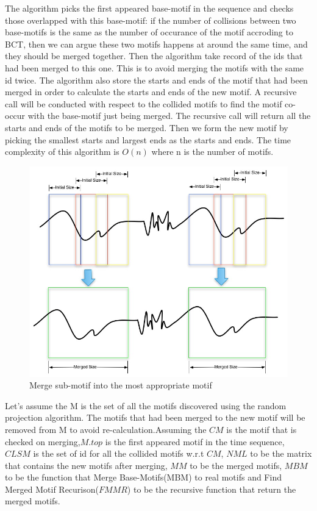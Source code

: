 \documentclass{article}
\begin{document}
 The algorithm picks the first appeared base-motif in the sequence and checks those 
overlapped with this base-motif: if the number of collisions between two base-motifs is the same as the number of occurance of the motif accroding 
to BCT, then we can argue these two motifs happens at around the same time, and they should be merged together. 
Then the algorithm take record of the ids that had been merged to this one. This is to avoid merging the motifs with the same id twice. 
The algorithm also store the starts and ends of the motif that had been merged in order to calculate the starts and ends of the new motif.
 A recursive call will be conducted with respect to the collided motifs to find the motif co-occur with the base-motif just being merged. 
The recursive call will return all the starts and ends of the motifs to be merged. Then we form the new motif by picking the smallest starts and largest ends as the starts and ends.  The time complexity of this algorithm is $O(n)$ where n is the number of motifs. 

\begin{figure}
  \centering
  \includegraphics[scale=0.3]{MotifMerge}
  \caption{Merge sub-motif into the most appropriate motif}
\end{figure}

Let's assume the M is the set of all the motifs discovered using the random projection algorithm. The motifs that had been merged to the new motif will be removed from M to avoid re-calculation.Assuming the $CM$ is the motif that is checked on merging,$M.top$ is the first appeared motif in the time sequence, $CLSM$ is the set of id for all the collided motifs w.r.t $CM$, $NML$ to be the matrix that contains the new motifs after merging, $MM$ to be the merged motifs, $MBM$ to be the function that Merge Base-Motifs(MBM) to real motifs and Find Merged Motif Recurison($FMMR$) to be the recursive function that return the merged motifs. 
\end{document}
